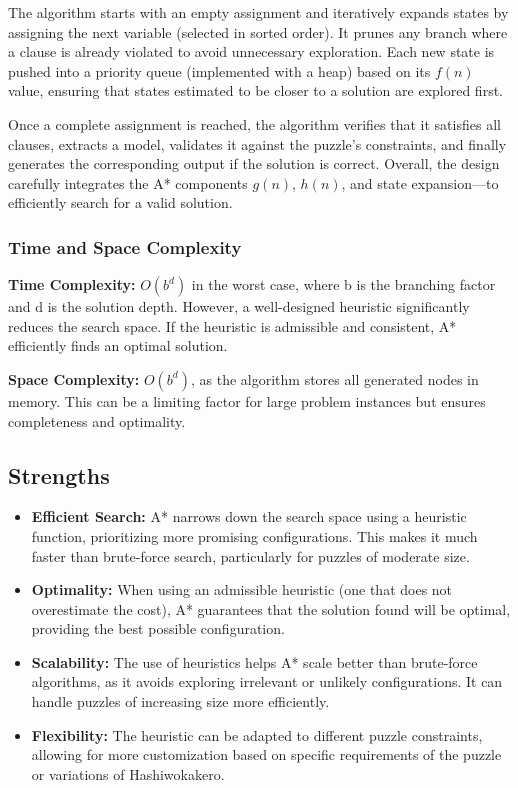The algorithm starts with an empty assignment and iteratively expands states by assigning the next variable (selected in sorted order). It prunes any branch where a clause is already violated to avoid unnecessary exploration. Each new state is pushed into a priority queue (implemented with a heap) based on its \( f(n) \) value, ensuring that states estimated to be closer to a solution are explored first.

Once a complete assignment is reached, the algorithm verifies that it satisfies all clauses, extracts a model, validates it against the puzzle's constraints, and finally generates the corresponding output if the solution is correct. Overall, the design carefully integrates the A* components \( g(n) \), \( h(n) \), and state expansion—to efficiently search for a valid solution.

\subsubsection{Time and Space Complexity}
\textbf{Time Complexity:} \( O(b^d) \) in the worst case, where b is the branching factor and d is the solution depth. However, a well-designed heuristic significantly reduces the search space. If the heuristic is admissible and consistent, A* efficiently finds an optimal solution.

\textbf{Space Complexity:} \( O(b^d) \), as the algorithm stores all generated nodes in memory. This can be a limiting factor for large problem instances but ensures completeness and optimality.



\subsection*{Strengths}
\begin{itemize}
    \item \textbf{Efficient Search:} A* narrows down the search space using a heuristic function, prioritizing more promising configurations. This makes it much faster than brute-force search, particularly for puzzles of moderate size.
    \item \textbf{Optimality:} When using an admissible heuristic (one that does not overestimate the cost), A* guarantees that the solution found will be optimal, providing the best possible configuration.
    \item \textbf{Scalability:} The use of heuristics helps A* scale better than brute-force algorithms, as it avoids exploring irrelevant or unlikely configurations. It can handle puzzles of increasing size more efficiently.
    \item \textbf{Flexibility:} The heuristic can be adapted to different puzzle constraints, allowing for more customization based on specific requirements of the puzzle or variations of Hashiwokakero.
\end{itemize}

